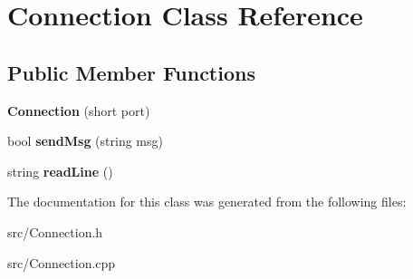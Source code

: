 \hypertarget{class_connection}{}\section{Connection Class Reference}
\label{class_connection}
\subsection*{Public Member Functions}
\begin{DoxyCompactItemize}
\item 
{\bfseries Connection} (short port)\hypertarget{class_connection_a8089476d48ba545f44e691cd4bd0278d}{}\label{class_connection_a8089476d48ba545f44e691cd4bd0278d}

\item 
bool {\bfseries send\+Msg} (string msg)\hypertarget{class_connection_a4b9f6db1fb42fc9857f829fa0bc52e6e}{}\label{class_connection_a4b9f6db1fb42fc9857f829fa0bc52e6e}

\item 
string {\bfseries read\+Line} ()\hypertarget{class_connection_a1df16b436751b686d96c24ca0c498659}{}\label{class_connection_a1df16b436751b686d96c24ca0c498659}

\end{DoxyCompactItemize}


The documentation for this class was generated from the following files\+:\begin{DoxyCompactItemize}
\item 
src/Connection.\+h\item 
src/Connection.\+cpp\end{DoxyCompactItemize}
